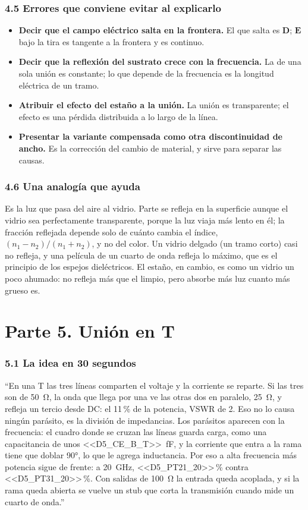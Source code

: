 \documentclass[11pt,letterpaper]{article}
\begin{document}
\section*{4.5 Errores que conviene evitar al explicarlo}
\begin{itemize}
\item \textbf{Decir que el campo eléctrico salta en la frontera.} El que salta es $\mathbf{D}$; $\mathbf{E}$ bajo la tira es tangente a la frontera y es continuo.
\item \textbf{Decir que la reflexión del sustrato crece con la frecuencia.} La de una sola unión es constante; lo que depende de la frecuencia es la longitud eléctrica de un tramo.
\item \textbf{Atribuir el efecto del estaño a la unión.} La unión es transparente; el efecto es una pérdida distribuida a lo largo de la línea.
\item \textbf{Presentar la variante compensada como otra discontinuidad de ancho.} Es la corrección del cambio de material, y sirve para separar las causas.
\end{itemize}

\section*{4.6 Una analogía que ayuda}
Es la luz que pasa del aire al vidrio. Parte se refleja en la superficie aunque el vidrio sea perfectamente transparente, porque la luz viaja más lento en él; la fracción reflejada depende solo de cuánto cambia el índice, $(n_1-n_2)/(n_1+n_2)$, y no del color. Un vidrio delgado (un tramo corto) casi no refleja, y una película de un cuarto de onda refleja lo máximo, que es el principio de los espejos dieléctricos. El estaño, en cambio, es como un vidrio un poco ahumado: no refleja más que el limpio, pero absorbe más luz cuanto más grueso es.

\newpage
\part*{Parte 5. Unión en T}

\section*{5.1 La idea en 30 segundos}
\begin{idea}
``En una T las tres líneas comparten el voltaje y la corriente se reparte. Si las tres son de \SI{50}{\ohm}, la onda que llega por una ve las otras dos en paralelo, \SI{25}{\ohm}, y refleja un tercio desde DC: el 11\,\% de la potencia, VSWR de 2. Eso no lo causa ningún parásito, es la división de impedancias. Los parásitos aparecen con la frecuencia: el cuadro donde se cruzan las líneas guarda carga, como una capacitancia de unos \SI{<<D5_CE_B_T>>}{fF}, y la corriente que entra a la rama tiene que doblar \ang{90}, lo que le agrega inductancia. Por eso a alta frecuencia más potencia sigue de frente: a \SI{20}{GHz}, <<D5_PT21_20>>\,\% contra <<D5_PT31_20>>\,\%. Con salidas de \SI{100}{\ohm} la entrada queda acoplada, y si la rama queda abierta se vuelve un stub que corta la transmisión cuando mide un cuarto de onda.''
\end{idea}
\end{document}
